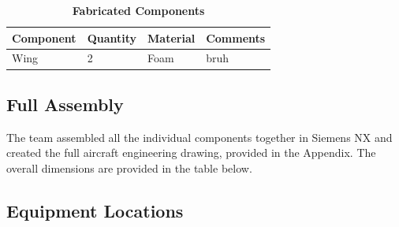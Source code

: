     
    
     \begin{table}[H]
         \begin{center}
         \caption{\textbf{Fabricated Components}} \label{table:fab_components}
         \begin{tabular}{|p{2in}|p{1in}|p{1in}|p{1in}|} %
             \hline \textbf{Component} & \textbf{Quantity} & \textbf{Material} & \textbf{Comments} \\ \hline %
             Wing & 2 & Foam & bruh \\ \hline
         \end{tabular}
         \end{center}
     \end{table}
    
    \subsection{Full Assembly}
    
    The team assembled all the individual components together in Siemens NX and created the full aircraft engineering drawing, provided in the Appendix. The overall dimensions are provided in the table below.
    
    
    
    
    \subsection{Equipment Locations}
    
